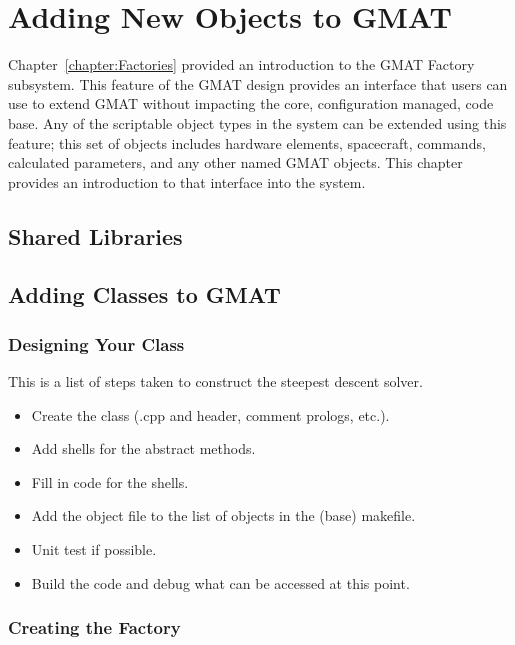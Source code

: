 \chapter{\label{chapter:ExtendingGMAT}Adding New Objects to GMAT}

Chapter~\ref{chapter:Factories} provided an introduction to the GMAT Factory subsystem.  This
feature of the GMAT design provides an interface that users can use to extend GMAT without
impacting the core, configuration managed, code base.  Any of the scriptable object types in the
system can be extended using this feature; this set of objects includes hardware elements,
spacecraft, commands, calculated parameters, and any other named GMAT objects.  This chapter
provides an introduction to that interface into the system.
\section{Shared Libraries}

\section{Adding Classes to GMAT}

\subsection{Designing Your Class}

This is a list of steps taken to construct the steepest descent solver.

\begin{itemize}
\item Create the class (.cpp and header, comment prologs, etc.).
\item Add shells for the abstract methods.
\item Fill in code for the shells.
\item Add the object file to the list of objects in the (base) makefile.
\item Unit test if possible.
\item Build the code and debug what can be accessed at this point.
\end{itemize}

\subsection{Creating the Factory}

